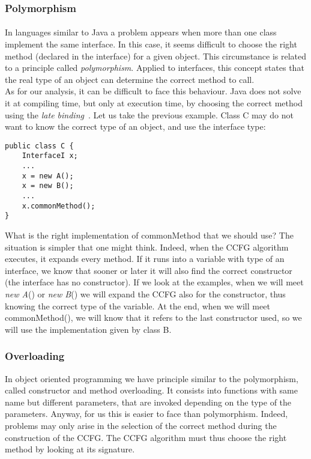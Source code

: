 \documentclass[letterpaper,twocolumn,10pt]{article}
\begin{document}
\subsubsection{Polymorphism} \paragraph{}
In languages similar to Java a problem appears when more than one class implement the same interface. In this case, it seems difficult to choose the right method (declared in the interface) for a given object. This circumstance is related to a principle called \emph{polymorphism}. Applied to interfaces, this concept states that the real type of an object can determine the correct method to call.\\
As for our analysis, it can be difficult to face this behaviour. Java does not solve it at compiling time, but only at execution time, by choosing the correct method using the \emph{late binding}~\cite{Horstmann:2008:BJ:1796502}. Let us take the previous example. Class C may do not want to know the correct type of an object, and use the interface type:
\begin{verbatim}
public class C {
    InterfaceI x;
    ...
    x = new A();
    x = new B();
    ...
    x.commonMethod();
}
\end{verbatim}
What is the right implementation of commonMethod that we should use? The situation is simpler that one might think. Indeed, when the CCFG algorithm executes, it expands every method. If it runs into a variable with type of an interface, we know that sooner or later it will also find the correct constructor (the interface has no constructor). If we look at the examples, when we will meet \emph{new A}() or \emph{new B}() we will expand the CCFG also for the constructor, thus knowing the correct type of the variable. At the end, when we will meet commonMethod(), we will know that it refers to the last constructor used, so we will use the implementation given by class B.

\subsubsection{Overloading}
In object oriented programming we have principle similar to the polymorphism, called constructor and method overloading. It consists into functions with same name but different parameters, that are invoked depending on the type of the parameters. Anyway, for us this is easier to face than polymorphism. Indeed, problems may only arise in the selection of the correct method during the construction of the CCFG. The CCFG algorithm must thus choose the right method by looking at its signature. 
\end{document}
